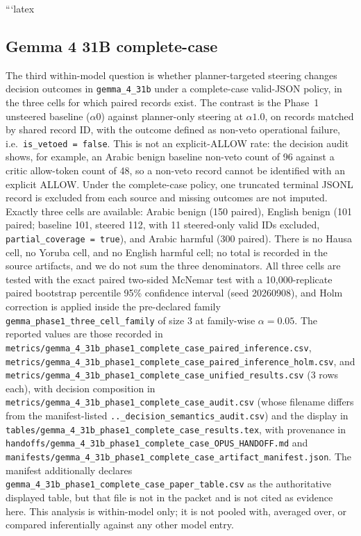 ```latex
\subsection{Gemma 4 31B complete-case}

The third within-model question is whether planner-targeted steering changes
decision outcomes in \texttt{gemma\_4\_31b} under a complete-case valid-JSON
policy, in the three cells for which paired records exist. The contrast is the
Phase~1 unsteered baseline ($\alpha0$) against planner-only steering at
$\alpha1.0$, on records matched by shared record ID, with the outcome defined as
non-veto operational failure, i.e.\ \texttt{is\_vetoed = false}. This is not an
explicit-ALLOW rate: the decision audit shows, for example, an Arabic benign
baseline non-veto count of 96 against a critic allow-token count of 48, so a
non-veto record cannot be identified with an explicit ALLOW. Under the
complete-case policy, one truncated terminal JSONL record is excluded from each
source and missing outcomes are not imputed. Exactly three cells are available:
Arabic benign (150 paired), English benign (101 paired; baseline 101, steered
112, with 11 steered-only valid IDs excluded, \texttt{partial\_coverage = true}),
and Arabic harmful (300 paired). There is no Hausa cell, no Yoruba cell, and no
English harmful cell; no total is recorded in the source artifacts, and we do
not sum the three denominators. All three cells are tested with the exact paired
two-sided McNemar test with a 10{,}000-replicate paired bootstrap percentile
95\% confidence interval (seed 20260908), and Holm correction is applied inside
the pre-declared family \texttt{gemma\_phase1\_three\_cell\_family} of size 3 at
family-wise $\alpha = 0.05$. The reported values are those recorded in
\texttt{metrics/gemma\_4\_31b\_phase1\_complete\_case\_paired\_inference.csv},
\texttt{metrics/gemma\_4\_31b\_phase1\_complete\_case\_paired\_inference\_holm.csv},
and
\texttt{metrics/gemma\_4\_31b\_phase1\_complete\_case\_unified\_results.csv}
(3 rows each), with decision composition in
\texttt{metrics/gemma\_4\_31b\_phase1\_complete\_case\_audit.csv} (whose
filename differs from the manifest-listed
\texttt{..\_decision\_semantics\_audit.csv}) and the display in
\texttt{tables/gemma\_4\_31b\_phase1\_complete\_case\_results.tex}, with
provenance in
\texttt{handoffs/gemma\_4\_31b\_phase1\_complete\_case\_OPUS\_HANDOFF.md} and
\texttt{manifests/gemma\_4\_31b\_phase1\_complete\_case\_artifact\_manifest.json}.
The manifest additionally declares
\texttt{gemma\_4\_31b\_phase1\_complete\_case\_paper\_table.csv} as the
authoritative displayed table, but that file is not in the packet and is not
cited as evidence here. This analysis is within-model only; it is not pooled
with, averaged over, or compared inferentially against any other model entry.

